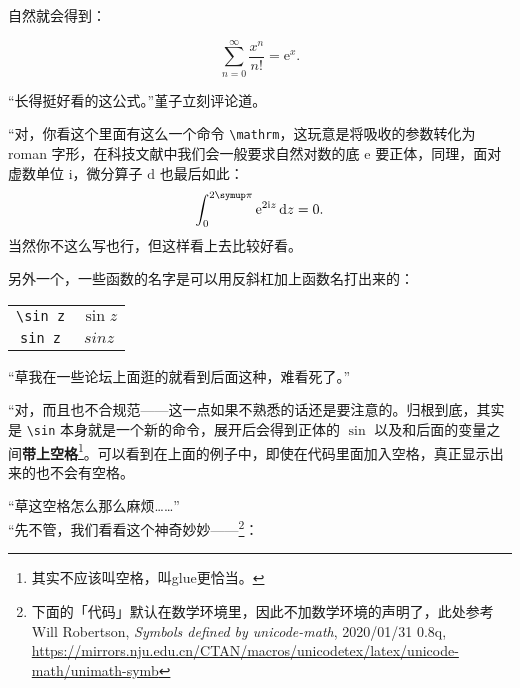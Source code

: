 {自然就会得到：

\begin{codeing}

    \[
        \sum_{n=0}^{\infty} \frac{x^n}{n!} = \mathrm{e} ^ x
        .\]
\end{codeing}
“长得挺好看的这公式。”堇子立刻评论道。

“对，你看这个里面有这么一个命令 \verb"\mathrm"，这玩意是将吸收的参数转化为 roman 字形，在科技文献中我们会一般要求自然对数的底 \(\mathrm{e}\) 要正体，同理，面对虚数单位 \(\mathrm{i}\)，微分算子 \(\mathrm{d}\) 也最后如此：
\[
    \int_0^{2\symup\pi } \mathrm{e} ^ {2 \mathrm{i} z } \,\mathrm{d}z = 0
    .\]
当然你不这么写也行，但这样看上去比较好看。

另外一个，一些函数的名字是可以用反斜杠加上函数名打出来的：

\begin{center}
    \begin{tabular}{cc}
        \verb"\sin z"    &    \(\sin z\)    \\
        \verb"sin z"     &    \(sin z\)     \\
    \end{tabular}
\end{center}

“草我在一些论坛上面逛的就看到后面这种，难看死了。”

“对，而且也不合规范——这一点如果不熟悉的话还是要注意的。归根到底，其实是 \verb"\sin" 本身就是一个新的命令，展开后会得到正体的 \(\sin \) 以及和后面的变量之间\textbf{带上空格}\footnote{其实不应该叫空格，叫glue更恰当。}。可以看到在上面的例子中，即使在代码里面加入空格，真正显示出来的也不会有空格。

“草这空格怎么那么麻烦……”\\

“先不管，我们看看这个神奇妙妙——\footnote{下面的「代码」默认在数学环境里，因此不加数学环境的声明了，此处参考 Will Robertson, \textit{Symbols defined by unicode-math}, 2020/01/31
    0.8q, \url{https://mirrors.nju.edu.cn/CTAN/macros/unicodetex/latex/unicode-math/unimath-symb}}：


}
